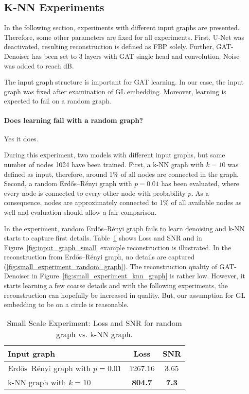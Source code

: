  \subsection{K-NN Experiments}
  In the following section, experiments with different input graphs are presented.
  Therefore, some other parameters are fixed for all experiments.
  First, U-Net was deactivated, resulting reconstruction is defined as FBP solely.
  Further, GAT-Denoiser has been set to 3 layers with GAT single head and convolution. 
  Noise was added to reach  dB.

  The input graph structure is important for GAT learning.
  In our case, the input graph was fixed after examination of GL embedding.
  Moreover, learning is expected to fail on a random graph.

  \paragraph{Does learning fail with a random graph?}
  Yes it does.

  During this experiment, two models with different input graphs, but same number of nodes 1024 have been trained.
  First, a k-NN graph with $k=10$ was defined as input, therefore, around 1\% of all nodes are connected in the graph.
  Second, a random Erdős–Rényi graph with $p=0.01$ has been evaluated, where every node is 
  connected to every other node with probability $p$. 
  As a consequence, nodes are approximately connected to 1\% of all available nodes as well and 
  evaluation should allow a fair comparison.
  
  In the experiment, random Erdős–Rényi graph fails to learn denoising and k-NN starts to capture first details.
  Table~\ref{tab:input_graph} shows Loss and SNR and in Figure~\ref{fig:input_graph_small} example reconstruction is illustrated.
  In the reconstruction from Erdős–Rényi graph, no details are captured (\ref{fig:small_experiment_random_graph}). 
  The reconstruction quality of GAT-Denoiser in Figure~\ref{fig:small_experiment_knn_graph} is rather low. 
  However, it starts learning a few coarse details and with the following experiments, the reconstruction can hopefully be 
  increased in quality. But, our assumption for GL embedding to be on a circle is reasonable.

  \begin{table}[H]
    \centering
      \begin{tabular}{l|cc}
      \toprule
      \small  \textbf{Input graph} & \small \textbf{Loss} & \small \textbf{SNR}  \\ 
      \midrule
      Erdős–Rényi graph with $p=0.01$    &  1267.16         &  3.65   \\ \hline
      k-NN graph with $k=10$             &  \textbf{804.7}           &  \textbf{7.3 }   \\ \hline
      \midrule
      \end{tabular}
    \caption{Small Scale Experiment: Loss and SNR for random graph vs. k-NN graph. }
    \label{tab:input_graph}
  \end{table}

